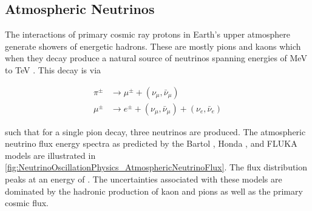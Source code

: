 \subsection{Atmospheric Neutrinos}
\label{subsec:NeutrinoOscillationPhysics_AtmosphericNeutrinos}

The interactions of primary cosmic ray protons in Earth's upper atmosphere generate showers of energetic hadrons. These are mostly pions and kaons which when they decay produce a natural source of neutrinos spanning energies of MeV to TeV \cite{Gaisser2002-gl}. This decay is via

\begin{equation}
  \label{eq:NeutrinoOscillationPhysics_PionDecay}
  \begin{split}
    \pi^{\pm} &\rightarrow \mu^{\pm} + (\nu_{\mu},\bar{\nu}_\mu) \\
    \mu^{\pm} &\rightarrow e^{\pm} + (\nu_{\mu},\bar{\nu}_\mu) + (\nu_{e},\bar{\nu}_e)
  \end{split}
\end{equation}

such that for a single pion decay, three neutrinos are produced. The atmospheric neutrino flux energy spectra as predicted by the Bartol \cite{Barr_2004}, Honda \cite{Honda_2007, PhysRevD.70.043008}, and FLUKA \cite{etde_20239111} models are illustrated in \autoref{fig:NeutrinoOscillationPhysics_AtmosphericNeutrinoFlux}. The flux distribution peaks at an energy of . The uncertainties associated with these models are dominated by the hadronic production of kaon and pions as well as the primary cosmic flux. 

